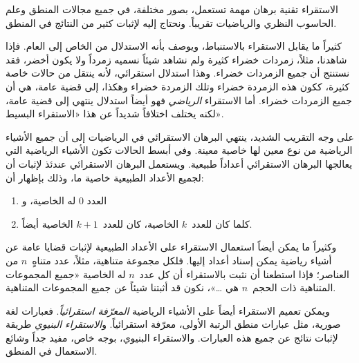 \documentclass[../../../include/open-logic-section]{subfiles}
\begin{document}


الاستقراء تقنية برهان مهمة تستعمل، بصور مختلفة، في جميع مجالات المنطق
وعلم الحاسوب النظري والرياضيات تقريباً. ونحتاج إليه لإثبات كثير من
النتائج في المنطق.

كثيراً ما يقابل الاستقراء بالاستنباط، ويوصف بأنه الاستدلال من الخاص إلى
العام. فإذا شاهدنا، مثلاً، زمردات خضراء كثيرة ولم نشاهد شيئاً نسميه
زمرداً ولا يكون أخضر، فقد نستنتج أن جميع الزمردات خضراء. وهذا استدلال
استقرائي، لأنه ينتقل من حالات خاصة كثيرة، ككون هذه الزمردة خضراء وتلك
الزمردة خضراء وهكذا، إلى قضية عامة، هي أن جميع الزمردات خضراء. أما
الاستقراء \emph{الرياضي} فهو أيضاً استدلال ينتهي إلى قضية عامة، لكنه
يختلف اختلافاً شديداً عن هذا «الاستقراء البسيط».

على وجه التقريب الشديد، ينتهي البرهان الاستقرائي في الرياضيات إلى أن
جميع الأشياء الرياضية من نوع معين لها خاصية معينة. وفي أبسط الحالات
تكون الأشياء الرياضية التي يعالجها البرهان الاستقرائي أعداداً طبيعية.
ويستعمل البرهان الاستقرائي عندئذ لإثبات أن لجميع الأعداد الطبيعية خاصية
ما، وذلك بإظهار أن:
\begin{enumerate}
    \item العدد $0$ له الخاصية، و
    \item كلما كان للعدد~$k$ الخاصية، كان للعدد~$k+1$ الخاصية أيضاً.
\end{enumerate}
وكثيراً ما يمكن أيضاً استعمال الاستقراء على الأعداد الطبيعية لإثبات
قضايا عامة عن أشياء رياضية يمكن إسناد أعداد إليها. فلكل مجموعة متناهية،
مثلاً، عدد متناهٍ~$n$ من العناصر؛ فإذا استطعنا أن نثبت بالاستقراء أن كل
عدد~$n$ له الخاصية «جميع المجموعات المتناهية ذات الحجم~$n$ هي
\dots»، نكون قد أثبتنا شيئاً عن جميع المجموعات المتناهية.

ويمكن تعميم الاستقراء أيضاً على الأشياء الرياضية
\emph{المعرّفة استقرائياً}. فعبارات لغة صورية، مثل عبارات منطق الرتبة
الأولى، معرّفة استقرائياً. و\emph{الاستقراء البنيوي} طريقة لإثبات نتائج
عن جميع هذه العبارات. والاستقراء البنيوي، بوجه خاص، مفيد جداً وشائع
الاستعمال في المنطق.
\end{document}
